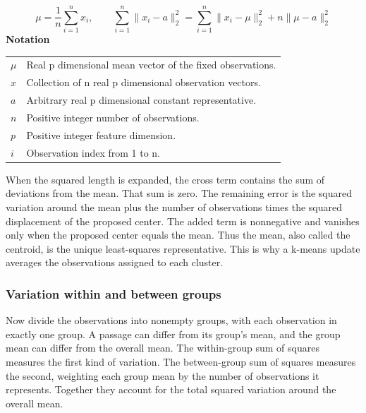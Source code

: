 \documentclass[10pt,letterpaper]{article}
\newcommand{\notlabel}{\noindent\textbf{Notation}\par\nobreak\vspace{4pt}}
\begin{document}
\par\noindent\begin{minipage}{\linewidth}
\begin{equation}\label{eq:mean}
\mu=\frac1n\sum_{i=1}^{n}x_i,\qquad\sum_{i=1}^{n}\lVert x_i-a\rVert_2^2=\sum_{i=1}^{n}\lVert x_i-\mu\rVert_2^2+n\lVert\mu-a\rVert_2^2
\end{equation}
\notlabel
{\fontsize{8.5}{10.5}\selectfont\setlength{\tabcolsep}{0pt}\renewcommand{\arraystretch}{1.12}
\begin{tabularx}{\linewidth}{@{}p{.14\linewidth}X@{}}
$\mu$ & Real p dimensional mean vector of the fixed observations.\\
$x$ & Collection of n real p dimensional observation vectors.\\
$a$ & Arbitrary real p dimensional constant representative.\\
$n$ & Positive integer number of observations.\\
$p$ & Positive integer feature dimension.\\
$i$ & Observation index from 1 to n.\\
\end{tabularx}}
\par\vspace{2pt}
\end{minipage}\par
When the squared length is expanded, the cross term contains the sum of deviations from the mean. That sum is zero. The remaining error is the squared variation around the mean plus the number of observations times the squared displacement of the proposed center. The added term is nonnegative and vanishes only when the proposed center equals the mean. Thus the mean, also called the centroid, is the unique least-squares representative. This is why a k-means update averages the observations assigned to each cluster.\par

\subsubsection{Variation within and between groups}
Now divide the observations into nonempty groups, with each observation in exactly one group. A passage can differ from its group's mean, and the group mean can differ from the overall mean. The within-group sum of squares measures the first kind of variation. The between-group sum of squares measures the second, weighting each group mean by the number of observations it represents. Together they account for the total squared variation around the overall mean.\par
\end{document}
